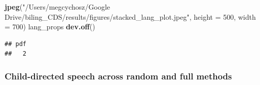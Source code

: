 \documentclass[
]{article}
\newenvironment{Shaded}{\begin{snugshade}}{\end{snugshade}}
\newcommand{\DataTypeTok}[1]{\textcolor[rgb]{0.13,0.29,0.53}{#1}}
\newcommand{\DecValTok}[1]{\textcolor[rgb]{0.00,0.00,0.81}{#1}}
\newcommand{\KeywordTok}[1]{\textcolor[rgb]{0.13,0.29,0.53}{\textbf{#1}}}
\newcommand{\NormalTok}[1]{#1}
\newcommand{\StringTok}[1]{\textcolor[rgb]{0.31,0.60,0.02}{#1}}
\begin{document}
\begin{Shaded}
\begin{Highlighting}[]
\KeywordTok{jpeg}\NormalTok{(}\StringTok{"/Users/megcychosz/Google Drive/biling_CDS/results/figures/stacked_lang_plot.jpeg"}\NormalTok{, }\DataTypeTok{height =} \DecValTok{500}\NormalTok{, }\DataTypeTok{width =} \DecValTok{700}\NormalTok{)}
\NormalTok{lang_props}
\KeywordTok{dev.off}\NormalTok{()}
\end{Highlighting}
\end{Shaded}

\begin{verbatim}
## pdf 
##   2
\end{verbatim}

\hypertarget{child-directed-speech-across-random-and-full-methods}{%
\subsubsection{Child-directed speech across random and full methods}\label{child-directed-speech-across-random-and-full-methods}}
\end{document}
